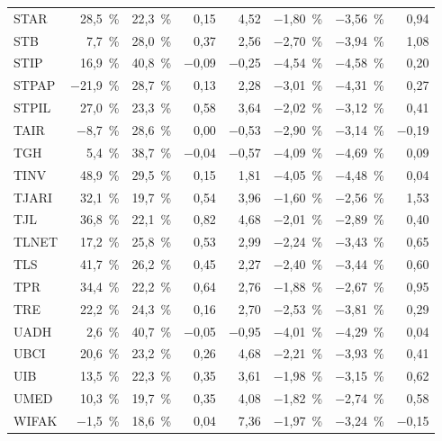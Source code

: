 \begin{longtable}{lrrrrrrr}
STAR & 28{,}5~\% & 22{,}3~\% & 0{,}15 & 4{,}52 & $-$1{,}80~\% & $-$3{,}56~\% & 0{,}94 \\
STB & 7{,}7~\% & 28{,}0~\% & 0{,}37 & 2{,}56 & $-$2{,}70~\% & $-$3{,}94~\% & 1{,}08 \\
STIP & 16{,}9~\% & 40{,}8~\% & $-$0{,}09 & $-$0{,}25 & $-$4{,}54~\% & $-$4{,}58~\% & 0{,}20 \\
STPAP & $-$21{,}9~\% & 28{,}7~\% & 0{,}13 & 2{,}28 & $-$3{,}01~\% & $-$4{,}31~\% & 0{,}27 \\
STPIL & 27{,}0~\% & 23{,}3~\% & 0{,}58 & 3{,}64 & $-$2{,}02~\% & $-$3{,}12~\% & 0{,}41 \\
TAIR & $-$8{,}7~\% & 28{,}6~\% & 0{,}00 & $-$0{,}53 & $-$2{,}90~\% & $-$3{,}14~\% & $-$0{,}19 \\
TGH & 5{,}4~\% & 38{,}7~\% & $-$0{,}04 & $-$0{,}57 & $-$4{,}09~\% & $-$4{,}69~\% & 0{,}09 \\
TINV & 48{,}9~\% & 29{,}5~\% & 0{,}15 & 1{,}81 & $-$4{,}05~\% & $-$4{,}48~\% & 0{,}04 \\
TJARI & 32{,}1~\% & 19{,}7~\% & 0{,}54 & 3{,}96 & $-$1{,}60~\% & $-$2{,}56~\% & 1{,}53 \\
TJL & 36{,}8~\% & 22{,}1~\% & 0{,}82 & 4{,}68 & $-$2{,}01~\% & $-$2{,}89~\% & 0{,}40 \\
TLNET & 17{,}2~\% & 25{,}8~\% & 0{,}53 & 2{,}99 & $-$2{,}24~\% & $-$3{,}43~\% & 0{,}65 \\
TLS & 41{,}7~\% & 26{,}2~\% & 0{,}45 & 2{,}27 & $-$2{,}40~\% & $-$3{,}44~\% & 0{,}60 \\
TPR & 34{,}4~\% & 22{,}2~\% & 0{,}64 & 2{,}76 & $-$1{,}88~\% & $-$2{,}67~\% & 0{,}95 \\
TRE & 22{,}2~\% & 24{,}3~\% & 0{,}16 & 2{,}70 & $-$2{,}53~\% & $-$3{,}81~\% & 0{,}29 \\
UADH & 2{,}6~\% & 40{,}7~\% & $-$0{,}05 & $-$0{,}95 & $-$4{,}01~\% & $-$4{,}29~\% & 0{,}04 \\
UBCI & 20{,}6~\% & 23{,}2~\% & 0{,}26 & 4{,}68 & $-$2{,}21~\% & $-$3{,}93~\% & 0{,}41 \\
UIB & 13{,}5~\% & 22{,}3~\% & 0{,}35 & 3{,}61 & $-$1{,}98~\% & $-$3{,}15~\% & 0{,}62 \\
UMED & 10{,}3~\% & 19{,}7~\% & 0{,}35 & 4{,}08 & $-$1{,}82~\% & $-$2{,}74~\% & 0{,}58 \\
WIFAK & $-$1{,}5~\% & 18{,}6~\% & 0{,}04 & 7{,}36 & $-$1{,}97~\% & $-$3{,}24~\% & $-$0{,}15 \\
\end{longtable}